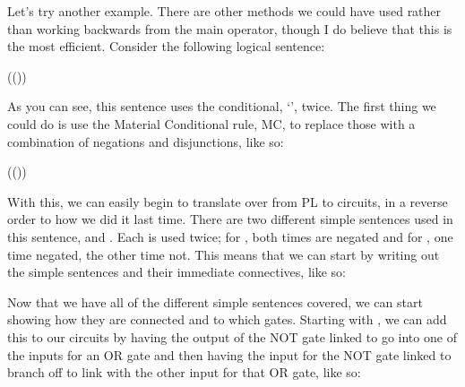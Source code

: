 Let's try another example. There are other methods we could have used rather than working backwards from the main operator, though I do believe that this is the most efficient. Consider the following logical sentence: 
\begin{center}
((\eif{})\eand\enot{})\eif\enot{}
\end{center}
As you can see, this sentence uses the conditional, `\eif', twice. The first thing we could do is use the Material Conditional rule, MC, to replace those with a combination of negations and disjunctions, like so:
\begin{center}
\enot((\enot{}\eor{})\eand\enot{})\eor\enot{}
\end{center}
With this, we can easily begin to translate over from PL to circuits, in a reverse order to how we did it last time. There are two different simple sentences used in this sentence,  and . Each is used twice; for , both times are negated and for , one time negated, the other time not. This means that we can start by writing out the simple sentences and their immediate connectives, like so:


Now that we have all of the different simple sentences covered, we can start showing how they are connected and to which gates. Starting with \enot{}\eor{}, we can add this to our circuits by having the output of the NOT gate linked to  go into one of the inputs for an OR gate and then having the input for the NOT gate linked to  branch off to link with the other input for that OR gate, like so: 

